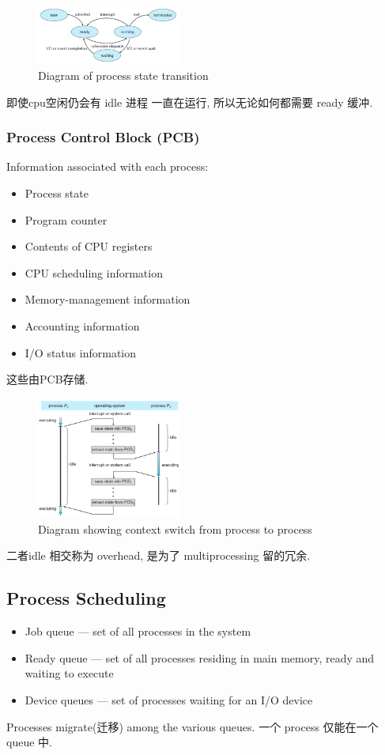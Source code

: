 \begin{figure}[!htb]
    \centering
    \includegraphics[width=0.42\textwidth]{pic/OS3/Diagram of process state.png}
    \caption{Diagram of process state transition}
\end{figure}
即使cpu空闲仍会有 idle 进程 一直在运行, 所以无论如何都需要 ready 缓冲. 

\subsubsection{Process Control Block (PCB)}
Information associated with each process: 
\begin{itemize}
    \item Process state
    \item Program counter
    \item Contents of CPU registers
    \item CPU scheduling information
    \item Memory-management information
    \item Accounting information
    \item I/O status information
\end{itemize}
这些由PCB存储.

\begin{figure}[!htb]
    \centering
    \includegraphics[width=0.42\textwidth]{pic/OS3/Diagram showing context switch from process to process}
    \caption{Diagram showing context switch from process to process}
\end{figure}
二者idle 相交称为 overhead, 是为了 multiprocessing 留的冗余. %

\subsection{Process Scheduling}
\begin{itemize}
    \item Job queue --- set of all processes in the system
    \item Ready queue --- set of all processes residing in main memory, ready and waiting to execute
    \item Device queues --- set of processes waiting for an I/O device
\end{itemize}
Processes migrate(迁移) among the various queues. 一个 process 仅能在一个 queue 中. 

